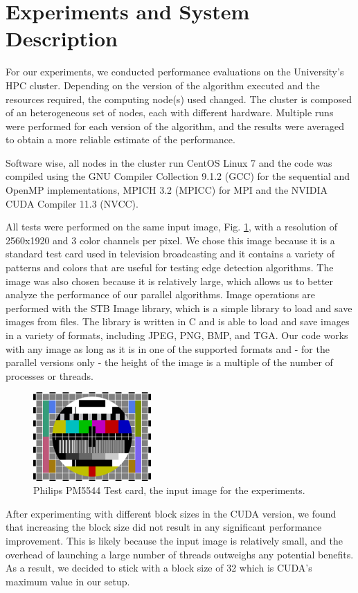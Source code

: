 \section{Experiments and System Description}

For our experiments, we conducted performance evaluations on the University's HPC %
cluster. Depending on the version of the algorithm executed and the resources required, %
the computing node(s) used changed. The cluster is composed of an heterogeneous set of nodes, %
each with different hardware. Multiple runs were performed for each version of the algorithm, %
and the results were averaged to obtain a more reliable estimate of the performance.

Software wise, all nodes in the cluster run CentOS Linux 7 and the code was compiled %
using the GNU Compiler Collection 9.1.2 (GCC) for the sequential and OpenMP %
implementations, MPICH 3.2 (MPICC) for MPI and the NVIDIA CUDA Compiler 11.3 (NVCC). %

All tests were performed on the same input image, Fig. \ref{fig:inputImage}, with a resolution of %
2560x1920 and 3 color channels per pixel. We chose this image because it is a standard %
test card used in television broadcasting and it contains a variety of patterns and %
colors that are useful for testing edge detection algorithms. The image was also chosen %
because it is relatively large, which allows us to better analyze the performance of our %
parallel algorithms. Image operations are performed %
with the STB Image library, which is a simple library to load and save images %
from files. The library is written in C and is able to load and save images in a %
variety of formats, including JPEG, PNG, BMP, and TGA. Our code works with any %
image as long as it is in one of the supported formats and - for the parallel versions only - %
the height of the image is a multiple of the number of processes or threads.

\begin{figure}
    \centering
    \includegraphics[width=0.4\textwidth]{../../tvTest.png}
    \caption{\label{fig:inputImage}Philips PM5544 Test card, the input image for the experiments.}
\end{figure}

After experimenting with different block sizes in the CUDA version, we found that %
increasing the block size did not result in any significant performance improvement. %
This is likely because the input image is relatively small, and the overhead of %
launching a large number of threads outweighs any potential benefits. As a result, %
we decided to stick with a block size of 32 which is CUDA's maximum value in our %
setup.
